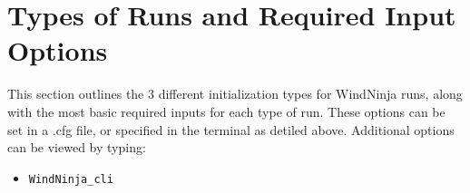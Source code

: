 \documentclass[12pt]{article}
\begin{document}
%
%
%



\section*{Types of Runs and Required Input Options}

This section outlines the 3 different initialization types for WindNinja runs, along with the most basic required inputs for each type of run. These options can be set in a .cfg file, or specified in the terminal as detiled above. Additional options can be viewed by typing: 
\begin{itemize}
\item[]\texttt{WindNinja\_cli} 
\end{itemize}
\end{document}
